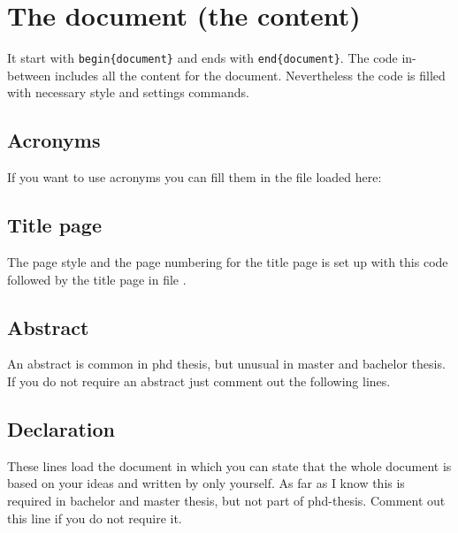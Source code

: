 
\section{The document (the content)}
\label{sec:main:document}
It start with \texttt{\bs{}begin\{document\}} and ends with \texttt{\bs{}end\{document\}}.
The code in-between includes all the content for the document. Nevertheless the code is filled with necessary style and settings commands.

\subsection{Acronyms}
If you want to use acronyms you can fill them in the file 
 loaded here:
%
\subsection{Title page}
The page style and the page numbering for the title page is set up with this code
%
followed by the title page in file .

\subsection{Abstract}
An abstract is common in phd thesis, but unusual in master and bachelor thesis. If you do not require an abstract just comment out the following lines.

\subsection{Declaration}
These lines load the document  in which you can state that the whole document is based on your ideas and written by only yourself. As far as I know this is required in bachelor and master thesis, but not part of phd-thesis. Comment out this line if you do not require it.

